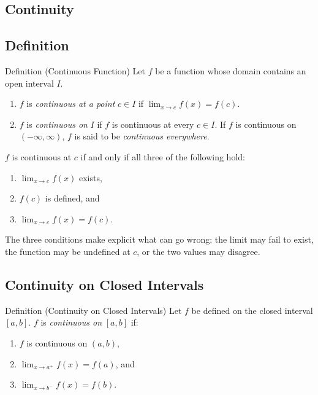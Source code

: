 \subsection{Continuity}

\subsection*{Definition}

\begin{propositionbox}{Definition (Continuous Function)}
Let $f$ be a function whose domain contains an open interval $I$.
\begin{enumerate}
  \item $f$ is \emph{continuous at a point} $c \in I$ if
        $\displaystyle\lim_{x \to c} f(x) = f(c)$.
  \item $f$ is \emph{continuous on} $I$ if $f$ is continuous at
        every $c \in I$. If $f$ is continuous on $(-\infty, \infty)$,
        $f$ is said to be \emph{continuous everywhere}.
\end{enumerate}
\end{propositionbox}

\begin{remark*}
$f$ is continuous at $c$ if and only if all three of the following hold:
\begin{enumerate}
  \item $\displaystyle\lim_{x \to c} f(x)$ exists,
  \item $f(c)$ is defined, and
  \item $\displaystyle\lim_{x \to c} f(x) = f(c)$.
\end{enumerate}
The three conditions make explicit what can go wrong: the limit may
fail to exist, the function may be undefined at $c$, or the two
values may disagree.
\end{remark*}

\subsection*{Continuity on Closed Intervals}

\begin{propositionbox}{Definition (Continuity on Closed Intervals)}
Let $f$ be defined on the closed interval $[a, b]$.
$f$ is \emph{continuous on} $[a, b]$ if:
\begin{enumerate}
  \item $f$ is continuous on $(a, b)$,
  \item $\displaystyle\lim_{x \to a^+} f(x) = f(a)$, and
  \item $\displaystyle\lim_{x \to b^-} f(x) = f(b)$.
\end{enumerate}
\end{propositionbox}

